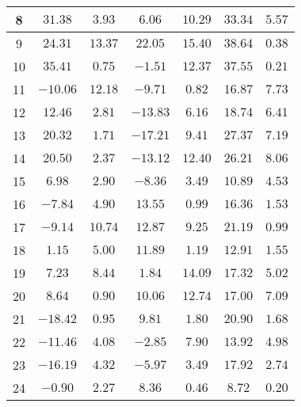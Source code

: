 \begin{table}[H]
\begin{tabular}{|c|c|c|c|c|c|c|}
                        8   &   $31.38$    &  $3.93$   &  $6.06$    &   $10.29$  &  $33.34$  &  $5.57$  \\ \hline
                        9   &   $24.31$    &  $13.37$  &  $22.05$   &   $15.40$  &  $38.64$  &  $0.38$  \\ \hline
                        10  &   $35.41$    &  $0.75$   &  $-1.51$   &   $12.37$  &  $37.55$  &  $0.21$  \\ \hline
                        11  &   $-10.06$   &  $12.18$  &  $-9.71$   &   $0.82$   &  $16.87$  &  $7.73$  \\ \hline
                        12  &   $12.46$    &  $2.81$   &  $-13.83$  &   $6.16$   &  $18.74$  &  $6.41$  \\ \hline
                        13  &   $20.32$    &  $1.71$   &  $-17.21$  &   $9.41$   &  $27.37$  &  $7.19$  \\ \hline
                        14  &   $20.50$    &  $2.37$   &  $-13.12$  &   $12.40$  &  $26.21$  &  $8.06$  \\ \hline
                        15  &   $6.98$     &  $2.90$   &  $-8.36$   &   $3.49$   &  $10.89$  &  $4.53$  \\ \hline
                        16  &   $-7.84$    &  $4.90$   &  $13.55$   &   $0.99$   &  $16.36$  &  $1.53$  \\ \hline
                        17  &   $-9.14$    &  $10.74$  &  $12.87$   &   $9.25$   &  $21.19$  &  $0.99$  \\ \hline
                        18  &   $1.15$     &  $5.00$   &  $11.89$   &   $1.19$   &  $12.91$  &  $1.55$  \\ \hline
                        19  &   $7.23$     &  $8.44$   &  $1.84$    &   $14.09$  &  $17.32$  &  $5.02$  \\ \hline
                        20  &   $8.64$     &  $0.90$   &  $10.06$   &   $12.74$  &  $17.00$  &  $7.09$  \\ \hline
                        21  &   $-18.42$   &  $0.95$   &  $9.81$    &   $1.80$   &  $20.90$  &  $1.68$  \\ \hline
                        22  &   $-11.46$   &  $4.08$   &  $-2.85$   &   $7.90$   &  $13.92$  &  $4.98$  \\ \hline
                        23  &   $-16.19$   &  $4.32$   &  $-5.97$   &   $3.49$   &  $17.92$  &  $2.74$  \\ \hline
                        24  &   $-0.90$    &  $2.27$   &  $8.36$    &   $0.46$   &  $8.72$   &  $0.20$  \\ \hline

\end{tabular}
\end{table}
